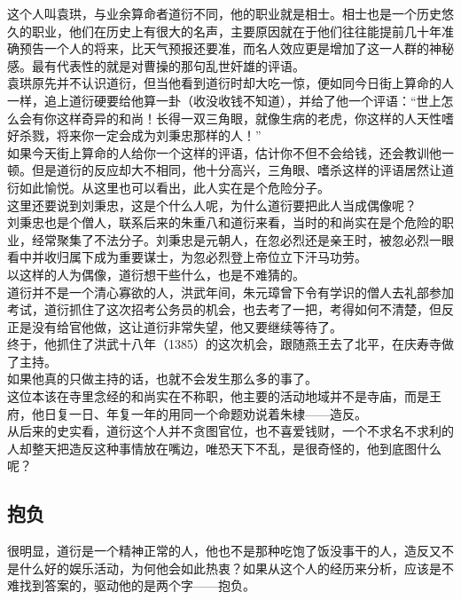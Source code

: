\begin{multicols}{\theparacolNo}
这个人叫袁珙，与业余算命者道衍不同，他的职业就是相士。相士也是一个历史悠久的职业，他们在历史上有很大的名声，主要原因就在于他们往往能提前几十年准确预告一个人的将来，比天气预报还要准，而名人效应更是增加了这一人群的神秘感。最有代表性的就是对曹操的那句乱世奸雄的评语。\\

袁珙原先并不认识道衍，但当他看到道衍时却大吃一惊，便如同今日街上算命的人一样，追上道衍硬要给他算一卦（收没收钱不知道），并给了他一个评语：“世上怎么会有你这样奇异的和尚！长得一双三角眼，就像生病的老虎，你这样的人天性嗜好杀戮，将来你一定会成为刘秉忠那样的人！”\\

如果今天街上算命的人给你一个这样的评语，估计你不但不会给钱，还会教训他一顿。但是道衍的反应却大不相同，他十分高兴，三角眼、嗜杀这样的评语居然让道衍如此愉悦。从这里也可以看出，此人实在是个危险分子。\\

这里还要说到刘秉忠，这是个什么人呢，为什么道衍要把此人当成偶像呢？\\

刘秉忠也是个僧人，联系后来的朱重八和道衍来看，当时的和尚实在是个危险的职业，经常聚集了不法分子。刘秉忠是元朝人，在忽必烈还是亲王时，被忽必烈一眼看中并收归属下成为重要谋士，为忽必烈登上帝位立下汗马功劳。\\

以这样的人为偶像，道衍想干些什么，也是不难猜的。\\

道衍并不是一个清心寡欲的人，洪武年间，朱元璋曾下令有学识的僧人去礼部参加考试，道衍抓住了这次招考公务员的机会，也去考了一把，考得如何不清楚，但反正是没有给官他做，这让道衍非常失望，他又要继续等待了。\\

终于，他抓住了洪武十八年（1385）的这次机会，跟随燕王去了北平，在庆寿寺做了主持。\\

如果他真的只做主持的话，也就不会发生那么多的事了。\\

这位本该在寺里念经的和尚实在不称职，他主要的活动地域并不是寺庙，而是王府，他日复一日、年复一年的用同一个命题劝说着朱棣——造反。\\

从后来的史实看，道衍这个人并不贪图官位，也不喜爱钱财，一个不求名不求利的人却整天把造反这种事情放在嘴边，唯恐天下不乱，是很奇怪的，他到底图什么呢？\\

\subsection{抱负}
很明显，道衍是一个精神正常的人，他也不是那种吃饱了饭没事干的人，造反又不是什么好的娱乐活动，为何他会如此热衷？如果从这个人的经历来分析，应该是不难找到答案的，驱动他的是两个字——抱负。\\


\end{multicols}
